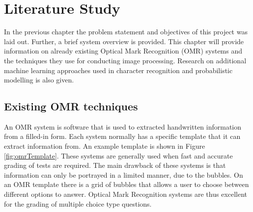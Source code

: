 \chapter{Literature Study}
\label{ch:LiteratureStudy}
\graphicspath{{Chapter2/Chapter2Figures/}}
In the previous chapter the problem statement and objectives of this project was laid out. Further, a brief system overview is provided.
This chapter will provide information on already existing Optical Mark Recognition (OMR) systems and the techniques they use for conducting image processing. Research on additional machine learning approaches used in character recognition and probabilistic modelling is also given.

\section{Existing OMR techniques}
An OMR system is software that is used to extracted handwritten information from a filled-in form. Each system normally has a specific template that it can extract information from. An example template is shown in Figure \ref{fig:omrTemplate}. These systems are generally used when fast and accurate grading of tests are required. The main drawback of these systems is that information can only be portrayed in a limited manner, due to the bubbles. On an OMR template there is a grid of bubbles that allows a user to choose between different options to answer. Optical Mark Recognition systems are thus excellent for the grading of multiple choice type questions. 


